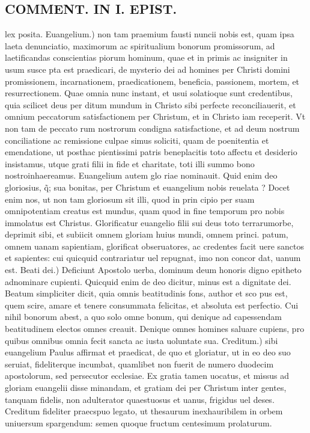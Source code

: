 \documentclass{article}
\begin{document}
\begin{pages}
\section*{COMMENT. IN I. EPIST. }
\marginpar{[ p.472 ]}\pstart lex posita. Euangelium.) non tam praemium fausti nuncii nobis est, quam ipsa laeta denunciatio, maximorum ac spiritualium bonorum promissorum, ad laetificandas conscientias piorum hominum, quae et in primis ac insigniter in usum susce pta est praedicari, de mysterio dei ad homines per Christi domini promissionem, incarnationem, praedicationem, beneficia, passionem, mortem, et resurrectionem. Quae omnia nunc instant, et usui solatioque sunt credentibus, quia scilicet deus per ditum mundum in Christo sibi perfecte reconciliauerit, et omnium peccatorum satisfactionem per Christum, et in Christo iam receperit. Vt non tam de peccato rum nostrorum condigna satisfactione, et ad deum nostrum conciliatione ac remissione culpae simus soliciti, quam de poenitentia et emendatione, ut posthac pientissimi patris beneplacitis toto affectu et desiderio insistamus, utque grati filii in fide et charitate, toti illi summo bono nostroinhaereamus. Euangelium autem glo riae nominauit. Quid enim deo gloriosius, q̃; sua bonitas, per Christum et euangelium nobis reuelata ? Docet enim nos, ut non tam gloriosum sit illi, quod in prin cipio per suam omnipotentiam creatus est mundus, quam quod in fine temporum pro nobis immolatus est Christus. Glorificatur euangelio filii sui deus toto terrarumorbe, deprimit sibi, et subiicit omnem gloriam huius mundi, omnem princi. patum, omnem uanam sapientiam, glorificat obseruatores, ac credentes facit uere sanctos et sapientes: cui quicquid contrariatur uel repugnat, imo non concor dat, uanum est. Beati dei.) Deficiunt Apostolo uerba, dominum deum honoris digno epitheto adnominare cupienti. Quicquid enim de deo dicitur, minus est a dignitate dei. Beatum simpliciter dicit, quia omnis beatitudinis fons, author et sco pus est, quem scire, amare et tenere consummata felicitas, et absoluta est perfectio. Cui nihil bonorum abest, a quo solo omne bonum, qui denique ad capessendam beatitudinem electos omnes creauit. Denique omnes homines saluare cupiens, pro quibus omnibus omnia fecit sancta ac iusta uoluntate sua. Creditum.) sibi euangelium Paulus affirmat et praedicat, de quo et gloriatur, ut in eo deo suo seruiat, fideliterque incumbat, quamlibet non fuerit de numero duodecim apostolorum, sed persecutor ecclesiae. Ex gratia tamen uocatus, et missus ad gloriam euangelii disse minandam, et gratiam dei per Christum inter gentes, tanquam fidelis, non adulterator quaestuosus et uanus, frigidus uel deses. Creditum fideliter praecspuo legato, ut thesaurum inexhauribilem in orbem uniuersum spargendum: semen quoque fructum centesimum prolaturum.  \pend
{}
{}

\end{pages}
\end{document}
